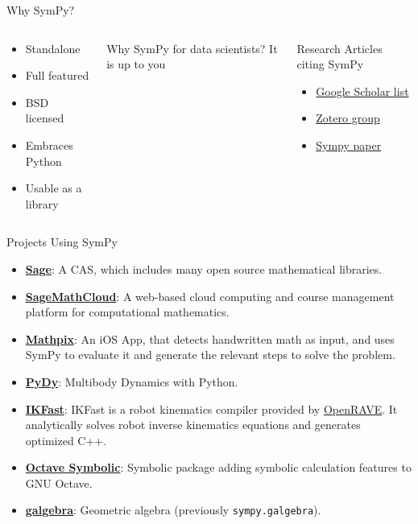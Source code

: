 \documentclass[aspectratio=169,xcolor=svgnames]{beamer}
\begin{document}
\begin{frame}{Why SymPy?}
    \begin{columns}
  \begin{block}{}
    \begin{itemize}
      \item Standalone
      \item Full featured
      \item BSD licensed
      \item Embraces Python
      \item Usable as a library
    \end{itemize}
  \end{block}
  \begin{block}{Why SymPy for data scientists?}
      It is up to you
  \end{block}
  \begin{block}{Research Articles citing SymPy}
    \begin{itemize}
        \item \href{https://scholar.google.cz/scholar?cites=2023909674275426142&as_sdt=2005&sciodt=0,5&hl=en}{Google Scholar list}
        \item \href{https://www.zotero.org/groups/525293/sympy/items/}{Zotero group}
        \item \href{https://peerj.com/articles/cs-103/}{Sympy paper}
    \end{itemize}
  \end{block}
    \end{columns}
\end{frame}
\begin{frame}{Projects Using SymPy}
    \begin{itemize}
\item
  \href{http://www.sagemath.org/}{\textbf{Sage}}: A CAS, which includes many open source mathematical libraries.
\item
  \href{https://cloud.sagemath.com}{\textbf{SageMathCloud}}:
  A web-based cloud computing and course management
  platform for computational mathematics.
\item
  \href{http://mathpix.com/}{\textbf{Mathpix}}: An iOS App, that detects
  handwritten math as input, and uses SymPy to evaluate it
  and generate the relevant steps to solve the problem.
\item
  \href{http://www.pydy.org/}{\textbf{PyDy}}: Multibody Dynamics with
  Python.
\item
  \href{http://openrave.org/docs/0.8.2/openravepy/ikfast/}{\textbf{IKFast}}:
  IKFast is a robot kinematics compiler provided by
  \href{http://openrave.org/}{OpenRAVE}. It analytically solves robot inverse
  kinematics equations and generates optimized C++. 
\item
  \href{http://octave.sourceforge.net/symbolic/}{\textbf{Octave Symbolic}}:
  Symbolic package adding symbolic calculation features
  to GNU Octave.
\item
  \href{https://github.com/brombo/galgebra}{\textbf{galgebra}}:
  Geometric algebra (previously \texttt{sympy.galgebra}).
    \end{itemize}
\end{frame}
\end{document}
